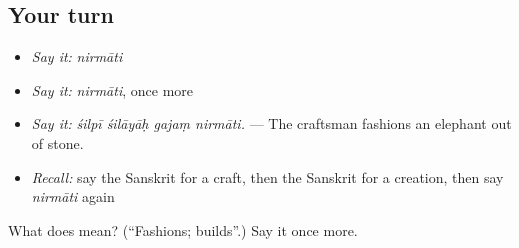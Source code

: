 \subsection*{Your turn}
\begin{itemize}
\raggedright
  \item \emph{Say it:} \emph{nirmāti}
  \item \emph{Say it:} \emph{nirmāti}, once more
  \item \emph{Say it:} \emph{śilpī śilāyāḥ gajaṃ nirmāti.} — The craftsman fashions an elephant out of stone.
  \item \emph{Recall:} say the Sanskrit for a craft, then the Sanskrit for a creation, then say \emph{nirmāti} again
\end{itemize}

\begin{tcolorbox}[breakable,colback=teal!4,colframe=teal!35!black,title={Before you move on}]
What does  mean? (\textquotedblleft{}Fashions; builds\textquotedblright{}.) Say it once more.
\end{tcolorbox}
